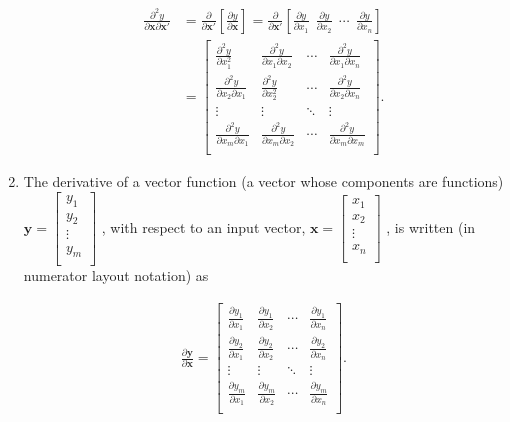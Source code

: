 \documentclass[10pt]{beamer}
\begin{document}
\begin{frame}[allowframebreaks]
\begin{enumerate}
    \begin{align*}
      \frac{\partial^2 y}{\partial \mathbf{x}\partial \mathbf{x}'}&=\frac{\partial
                                                                    }{\partial \mathbf{x}'}\left[\frac{\partial y}{\partial \mathbf{x}}\right]=\frac{\partial}{\partial \mathbf{x}'}\left[ \frac{\partial y}{\partial x_1} \ \ \frac{\partial y}{\partial x_2} \ \ \cdots \ \ \frac{\partial y}{\partial x_n} \right] \\&= \begin{bmatrix} \frac{\partial^2 y}{\partial x_1^2} & \frac{\partial^2 y}{\partial x_1\partial x_2} & \cdots & \frac{\partial^2 y}{\partial x_1\partial x_n}\\ \frac{\partial^2 y}{\partial x_2\partial x_1} & \frac{\partial^2 y}{\partial x_2^2} & \cdots & \frac{\partial^2 y}{\partial x_2\partial x_n}\\ \vdots & \vdots & \ddots & \vdots\\ \frac{\partial^2 y}{\partial x_m\partial x_1} & \frac{\partial^2 y}{\partial x_m\partial x_2} & \cdots & \frac{\partial^2 y}{\partial x_m\partial x_m}\\ \end{bmatrix}.
    \end{align*}

  \item The derivative of a vector function (a vector whose components are functions) $\mathbf{y} = \begin{bmatrix} y_1 \\ y_2 \\ \vdots \\ y_m \\ \end{bmatrix}$ , with respect to an input vector, $\mathbf{x} = \begin{bmatrix} x_1 \\ x_2 \\ \vdots \\ x_n \\ \end{bmatrix}$ , is written (in numerator layout notation) as

    \begin{align*}
      \frac{\partial \mathbf{y}}{\partial \mathbf{x}} = \begin{bmatrix} \frac{\partial y_1}{\partial x_1} & \frac{\partial y_1}{\partial x_2} & \cdots & \frac{\partial y_1}{\partial x_n}\\ \frac{\partial y_2}{\partial x_1} & \frac{\partial y_2}{\partial x_2} & \cdots & \frac{\partial y_2}{\partial x_n}\\ \vdots & \vdots & \ddots & \vdots\\ \frac{\partial y_m}{\partial x_1} & \frac{\partial y_m}{\partial x_2} & \cdots & \frac{\partial y_m}{\partial x_n}\\ \end{bmatrix}.
    \end{align*}


\end{enumerate}
\end{frame}
\end{document}
